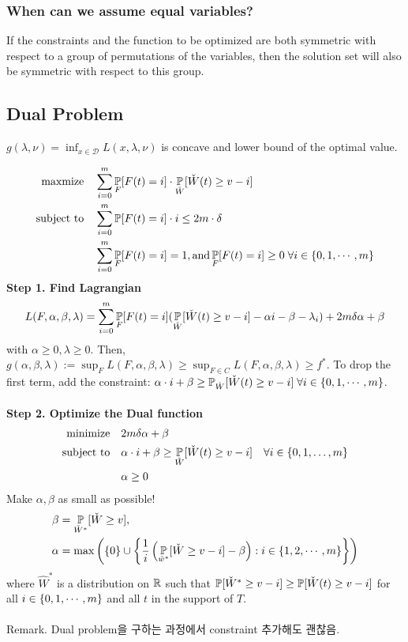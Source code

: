 \documentclass[10pt]{article}
\begin{document}
\subsubsection{When can we assume equal variables?}
If the \alert{constraints and the function to be optimized are both symmetric with respect to a group of permutations of the variables}, then the solution set will also be symmetric with respect to this group.
\subsection{Dual Problem}
$g(\lambda, \nu) = \inf_{x \in \mathcal{D}} L(x, \lambda, \nu) $ is concave and lower bound of the optimal value.  \medskip

\begin{align*}
    \text{maxmize}\quad & \sum_{i=0}^m \mathop{\mathbb{P} \displaystyle}_F [ F(t) = i ] \cdot \mathop{\mathbb{P} \displaystyle}_{\check{W}} [\check{W}(t) \geq v -i ]  \\ 
    \text{subject to}\quad  & \sum_{i=0}^m \mathop{\mathbb{P} \displaystyle}[F(t)=i] \cdot i \leq 2m \cdot \delta \\
    & \sum_{i=0}^m \mathop{\mathbb{P} \displaystyle}_F [F(t) =i ] =1, \text{and} \mathop{\mathbb{P} \displaystyle}_F [F(t) =i] \geq 0 \; \forall i \in \left\{ 0, 1, \cdots, m \right\} 
\end{align*}
\textbf{Step 1. Find Lagrangian}  
\begin{equation}
    L(F, \alpha, \beta, \lambda) = \sum_{i=0}^m \mathop{\mathbb{P} \displaystyle}_F [ F(t) = i] (\mathop{\mathbb{P} \displaystyle}_{\check{W}} [ \check{W}(t) \geq v- i] - \alpha i - \beta - \lambda_i)  + 2 m \delta \alpha + \beta 
\end{equation}
with $\alpha \geq  0, \lambda \geq 0.$ Then, $g(\alpha, \beta, \lambda) := \sup_F  L(F, \alpha, \beta, \lambda) \geq \sup_{F \in C} L(F, \alpha, \beta, \lambda) \geq f^*$.  To drop the first term, add the constraint: $\alpha \cdot i + \beta \geq \mathop{\mathbb{P} \displaystyle}_{\check{W}} [\check{W} (t) \geq v-i]  \; \forall i \in \left\{ 0,1, \cdots, m \right\}$.  \\~\\
\textbf{Step 2. Optimize the Dual function}  
\begin{align*}
    \text{minimize} \quad & 2m \delta \alpha+ \beta  \\ 
    \text{subject to} \quad & \alpha \cdot i + \beta \geq \mathop{\mathbb{P} \displaystyle}_{\check{W}} [\check{W} (t) \geq v -i] \quad \forall i \in \left\{ 0,1, \dots, m \right\} \\ 
    & \alpha \geq0 
\end{align*}
Make $\alpha,\beta$ as small as possible! 
\begin{align*}
    \beta &= \mathop{\mathbb{P} \displaystyle}_{\check{W}^*} [ \check{W} \geq v], \\ 
    \alpha &= \max \left( \left\{ 0 \right\} \cup \left\{ \frac{1}{i} \left( \mathop{\mathbb{P} \displaystyle}_{\check{w}^*} [\check{W} \geq v-i] - \beta \right) : i \in \left\{ 1,2, \cdots, m \right\} \right\} \right)
\end{align*}
where $\hat{W}^*$ is a distribution on $\mathbb{R}$ such that $\mathop{\mathbb{P} \displaystyle} [ \check{W}^* \geq v-i] \geq \mathop{\mathbb{P} \displaystyle} [\check{W} (t) \geq v-i]$ for all $i \in \left\{ 0,1, \cdots, m \right\}$ and all $t$ in the support of $T$.  \\~\\
\alert{Remark.} Dual problem을 구하는 과정에서 constraint 추가해도 괜찮음.
\end{document}
